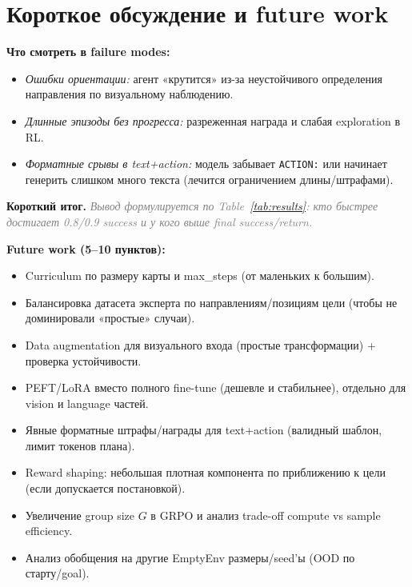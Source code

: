 \documentclass[10pt,a4paper]{article}
\newcommand{\tok}[1]{\texttt{#1}}
\newcommand{\placeholder}[1]{\textcolor{gray}{\textit{#1}}}
\begin{document}
\section{Короткое обсуждение и future work}
\textbf{Что смотреть в failure modes:}
\begin{itemize}
  \item \emph{Ошибки ориентации:} агент «крутится» из-за неустойчивого определения направления по визуальному наблюдению.
  \item \emph{Длинные эпизоды без прогресса:} разреженная награда и слабая exploration в RL.
  \item \emph{Форматные срывы в text+action:} модель забывает \tok{ACTION:} или начинает генерить слишком много текста (лечится ограничением длины/штрафами).
\end{itemize}

\textbf{Короткий итог.} \placeholder{Вывод формулируется по Table~\ref{tab:results}: кто быстрее достигает 0.8/0.9 success и у кого выше final success/return.}

\textbf{Future work (5--10 пунктов):}
\begin{itemize}
  \item Curriculum по размеру карты и max\_steps (от маленьких к большим).
  \item Балансировка датасета эксперта по направлениям/позициям цели (чтобы не доминировали «простые» случаи).
  \item Data augmentation для визуального входа (простые трансформации) + проверка устойчивости.
  \item PEFT/LoRA вместо полного fine-tune (дешевле и стабильнее), отдельно для vision и language частей.
  \item Явные форматные штрафы/награды для text+action (валидный шаблон, лимит токенов плана).
  \item Reward shaping: небольшая плотная компонента по приближению к цели (если допускается постановкой).
  \item Увеличение group size $G$ в GRPO и анализ trade-off compute vs sample efficiency.
  \item Анализ обобщения на другие EmptyEnv размеры/seed’ы (OOD по старту/goal).
\end{itemize}

\vspace{-0.2em}


\end{document}
